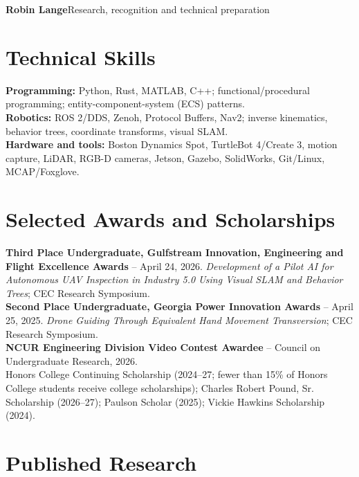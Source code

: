 {\large\sffamily\bfseries\color{resumenavy} Robin Lange}\hfill Research, recognition and technical preparation
\section{Technical Skills}
{\small
\textbf{Programming:} Python, Rust, MATLAB, C++; functional/procedural programming; entity-component-system (ECS) patterns.\\
\textbf{Robotics:} ROS 2/DDS, Zenoh, Protocol Buffers, Nav2; inverse kinematics, behavior trees, coordinate transforms, visual SLAM.\\
\textbf{Hardware and tools:} Boston Dynamics Spot, TurtleBot 4/Create 3, motion capture, LiDAR, RGB-D cameras, Jetson, Gazebo, SolidWorks, Git/Linux, MCAP/Foxglove.}
\section{Selected Awards and Scholarships}
{\small
\textbf{Third Place Undergraduate, Gulfstream Innovation, Engineering and Flight Excellence Awards} -- April 24, 2026. \textit{Development of a Pilot AI for Autonomous UAV Inspection in Industry 5.0 Using Visual SLAM and Behavior Trees}; CEC Research Symposium.\\[3pt]
\textbf{Second Place Undergraduate, Georgia Power Innovation Awards} -- April 25, 2025. \textit{Drone Guiding Through Equivalent Hand Movement Transversion}; CEC Research Symposium.\\[3pt]
\textbf{NCUR Engineering Division Video Contest Awardee} -- Council on Undergraduate Research, 2026.\\[3pt]
Honors College Continuing Scholarship (2024--27; fewer than 15\% of Honors College students receive college scholarships); Charles Robert Pound, Sr. Scholarship (2026--27); Paulson Scholar (2025); Vickie Hawkins Scholarship (2024).}
\section{Published Research}

